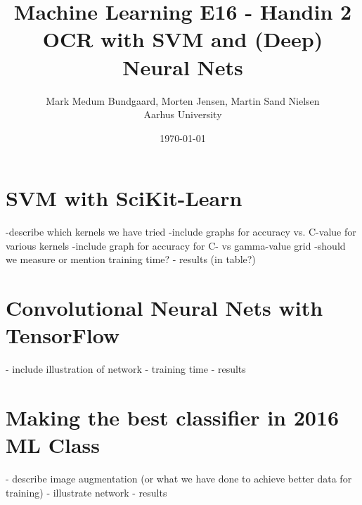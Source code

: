 \documentclass[a4paper,10pt,article,oneside,english]{memoir}
\begin{document}
	\title{Machine Learning E16 - Handin 2\\OCR with SVM and (Deep) Neural Nets}
	\author{Mark Medum Bundgaard, Morten Jensen, Martin Sand Nielsen\\ Aarhus University}
	\date{\today}
	
	\mainmatter
	\maketitle
	
	
\chapter{SVM with SciKit-Learn}
-describe which kernels we have tried
-include graphs for accuracy vs. C-value for various kernels
-include graph for accuracy for C- vs gamma-value grid
-should we measure or mention training time?
- results (in table?)

\chapter{Convolutional Neural Nets with TensorFlow}
- include illustration of network
- training time
- results

\chapter{Making the best classifier in 2016 ML Class}
- describe image augmentation (or what we have done to achieve better data for training)
- illustrate network
- results



	
\end{document}

